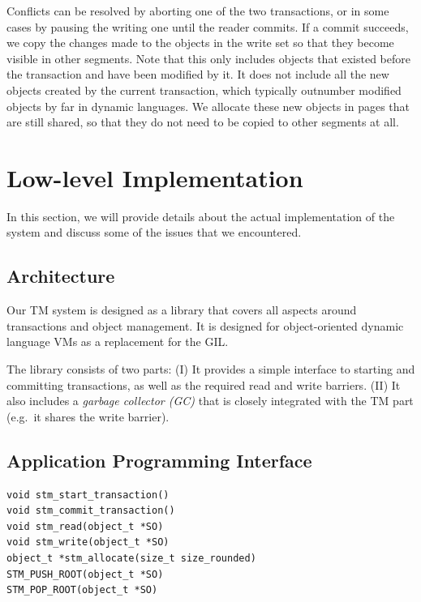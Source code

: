 \documentclass{sigplanconf}
\begin{document}
Conflicts can be resolved by aborting one of the two transactions, or
in some cases by pausing the writing one until the reader commits.  If a
commit succeeds, we copy the changes made to the objects in the write
set so that they become visible in other segments.  Note that this
only includes objects that existed before the transaction and have
been modified by it.  It does not include all the new objects created
by the current transaction, which typically outnumber modified objects
by far in dynamic languages.  We allocate these new objects in pages
that are still shared, so that they do not need to be copied to other
segments at all.



\section{Low-level Implementation\label{sub:Low-level-Implementation}}

In this section, we will provide details about the actual
implementation of the system and discuss some of the issues that we
encountered.


\subsection{Architecture}

Our TM system is designed as a library that covers all aspects around
transactions and object management. It is designed for object-oriented
dynamic language VMs as a replacement for the GIL.

The library consists of two parts: (I) It provides a simple interface
to starting and committing transactions, as well as the required read
and write barriers. (II) It also includes a \emph{garbage collector
(GC)} that is closely integrated with the TM part (e.g.\ it shares the
write barrier).


\subsection{Application Programming Interface\label{sub:Application-Programming-Interfac}}

\begin{lstlisting}
void stm_start_transaction()
void stm_commit_transaction()
void stm_read(object_t *SO)
void stm_write(object_t *SO)
object_t *stm_allocate(size_t size_rounded)
STM_PUSH_ROOT(object_t *SO)
STM_POP_ROOT(object_t *SO)
\end{lstlisting}
\end{document}
